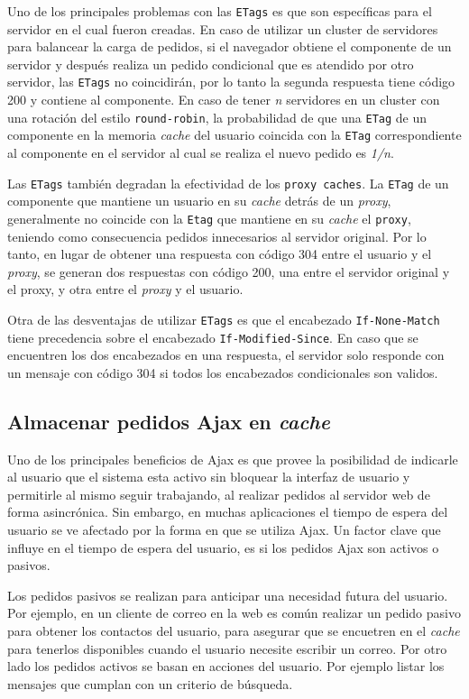 \documentclass[a4paper,12pt]{report}
\begin{document}
Uno de los principales problemas con las \texttt{ETags} es que son específicas para el servidor en el cual fueron creadas. En caso de utilizar un cluster de servidores para
balancear la carga de pedidos, si el navegador obtiene el componente de un servidor y después realiza un pedido condicional que es atendido por otro servidor, las
\texttt{ETags} no coincidirán, por lo tanto la segunda respuesta tiene código 200 y contiene al componente.
En caso de tener \emph{n} servidores en un cluster con una rotación del estilo \texttt{round-robin}, la probabilidad de que una \texttt{ETag} de un componente en la memoria
\emph{cache} del usuario coincida con la \texttt{ETag} correspondiente al componente en el servidor al cual se realiza el nuevo pedido es \emph{1/n}.

Las \texttt{ETags} también degradan la efectividad de los \texttt{proxy caches}. La \texttt{ETag} de un componente que mantiene un usuario en su \emph{cache} detrás de un
\emph{proxy}, generalmente no coincide con la \texttt{Etag} que mantiene en su \emph{cache} el \texttt{proxy}, teniendo como consecuencia pedidos innecesarios al servidor
original. Por lo tanto, en lugar de obtener una respuesta con código 304 entre el usuario y el \emph{proxy}, se generan dos respuestas con código 200, una entre el
servidor original y el proxy, y otra entre el \emph{proxy} y el usuario.

Otra de las desventajas de utilizar \texttt{ETags} es que el encabezado \texttt{If-None-Match} tiene precedencia sobre el encabezado \texttt{If-Modified-Since}. En caso que
se encuentren los dos encabezados en una respuesta, el servidor solo responde con un mensaje con código 304 si todos los encabezados condicionales son validos.

\subsection{Almacenar pedidos Ajax en \emph{cache}}

Uno de los principales beneficios de Ajax es que provee la posibilidad de indicarle al usuario que el sistema esta activo sin bloquear la
interfaz de usuario y permitirle al mismo seguir trabajando, al realizar pedidos al servidor web de forma asincrónica. Sin embargo, en muchas aplicaciones el
tiempo de espera del usuario se ve afectado por la forma en que se utiliza Ajax. Un factor clave que influye en el tiempo de espera del usuario, es si
los pedidos Ajax son activos o pasivos.

Los pedidos pasivos se realizan para anticipar una necesidad futura del usuario. Por ejemplo, en un cliente de correo en la web es común realizar un pedido pasivo para
obtener los contactos del usuario, para asegurar que se encuetren en el \emph{cache} para tenerlos disponibles cuando el usuario necesite escribir un correo.
Por otro lado los pedidos activos se basan en acciones del usuario. Por ejemplo listar los mensajes que cumplan con un criterio de búsqueda.
\end{document}
